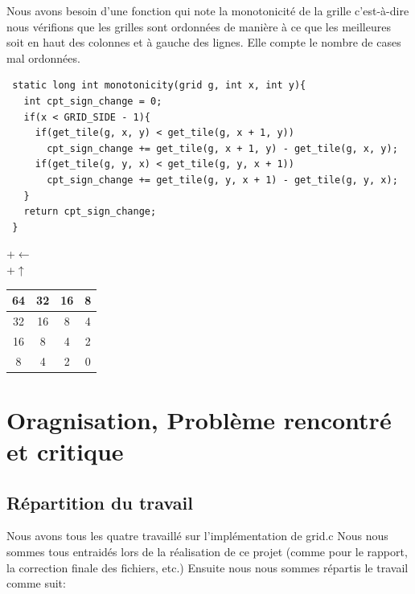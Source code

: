 \documentclass[a4paper]{article}
\begin{document}
 Nous avons besoin d'une fonction qui note la monotonicité de la grille
 c'est-à-dire nous vérifions que les grilles sont ordonnées de manière
 à ce que les meilleures soit en haut des colonnes et à gauche des lignes.
 Elle compte le nombre de cases mal ordonnées.

 \begin{verbatim}
 static long int monotonicity(grid g, int x, int y){
   int cpt_sign_change = 0;
   if(x < GRID_SIDE - 1){
     if(get_tile(g, x, y) < get_tile(g, x + 1, y))
       cpt_sign_change += get_tile(g, x + 1, y) - get_tile(g, x, y);
     if(get_tile(g, y, x) < get_tile(g, y, x + 1))
       cpt_sign_change += get_tile(g, y, x + 1) - get_tile(g, y, x);
   }  
   return cpt_sign_change;
 }
 \end{verbatim}


 \hspace{1.2cm} +$\leftarrow$\\
 +$\uparrow$
 \begin{tabular}{ | c | c | c | c | }


 \hline
 64 & 32 & 16 & 8 \\ \hline
 32 & 16 & 8  & 4 \\ \hline
 16 & 8  & 4  & 2 \\ \hline
 8  & 4  & 2  & 0 \\ \hline
 \end{tabular}


 \newpage
 \section{Oragnisation, Problème rencontré et critique}
 \label{sec-6}
 \subsection{Répartition du travail}
 \label{sec-6-1}

 Nous avons tous les quatre travaillé sur l'implémentation de grid.c
 Nous nous sommes tous entraidés lors de la réalisation de ce projet (comme pour le rapport, la correction finale des fichiers, etc.) 
 Ensuite nous nous sommes répartis le travail comme suit:
\end{document}
